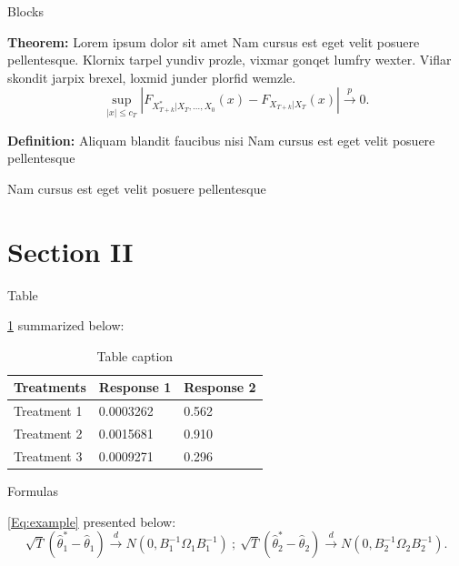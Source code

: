 \documentclass[aspectratio=169,xcolor=x11names]{beamer}
\begin{document}
\begin{frame}{Blocks}

    \begin{block}{\textbf{Theorem:} Lorem ipsum dolor sit amet}
        Nam cursus est eget velit posuere pellentesque. Klornix tarpel yundiv prozle, vixmar gonqet lumfry wexter. Viflar skondit jarpix brexel, loxmid junder plorfid wemzle. 
$$
   \sup_{|x|\leq c_T}\left|F_{X^*_{T+k}|X_{T},\ldots, X_{0}}(x) - F_{X_{T+k}|X_{T}}(x)\right|\overset{p}{\to} 0.   
$$
    \end{block}

    \begin{alertblock}{\textbf{Definition:} Aliquam blandit faucibus nisi}
        Nam cursus est eget velit posuere pellentesque
    \end{alertblock}

    \begin{example}
        Nam cursus est eget velit posuere pellentesque
    \end{example}
\end{frame}



\section{Section II}


\begin{frame}{Table}

\cref{Table:example} summarized below:
    \begin{table}
        \begin{tabular}{lll}
            \toprule
            \textbf{Treatments} & \textbf{Response 1} & \textbf{Response 2} \\
            \midrule
            Treatment 1         & 0.0003262           & 0.562               \\
            Treatment 2         & 0.0015681           & 0.910               \\
            Treatment 3         & 0.0009271           & 0.296               \\
            \bottomrule
        \end{tabular}
        \caption{Table caption \label{Table:example}}  
    \end{table}
\end{frame}


\begin{frame}{Formulas}

\cref{Eq:example} presented below:
\begin{equation}\label{Eq:example}
         \sqrt{T}(\widehat{\theta}^*_1 - \widehat{\theta}_1) \overset{d}{\to} N(0,B_1^{-1}\Omega_1 B_1^{-1})~;~\sqrt{T}(\widehat{\theta}^*_2 - \widehat{\theta}_2) \overset{d}{\to} N(0,B_2^{-1}\Omega_2 B_2^{-1}).
\end{equation}


\end{frame}
\end{document}
